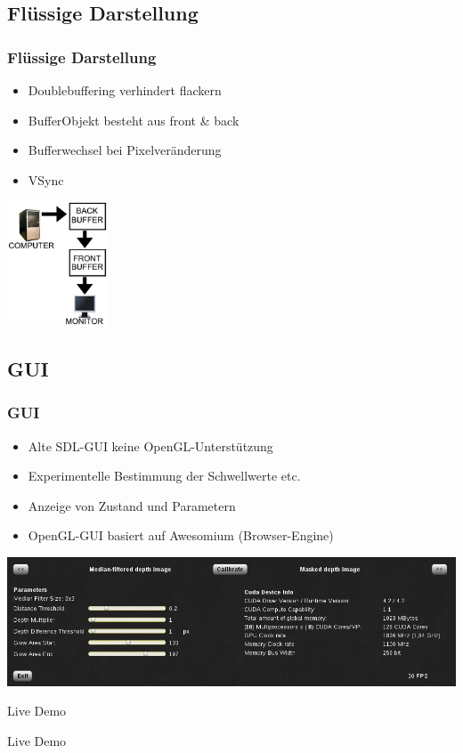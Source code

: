 \documentclass[compress]{beamer}
\begin{document}
\subsection{Flüssige Darstellung}
\begin{frame}
\frametitle{Flüssige Darstellung}
\begin{itemize}
\item Doublebuffering verhindert flackern
\item BufferObjekt besteht aus front \& back
\item Bufferwechsel bei Pixelveränderung
\item VSync
\end{itemize}
\hspace*{4cm}\includegraphics[width=3cm]{double.png}
\end{frame}

\subsection{GUI}
\begin{frame}
\frametitle{GUI}
\begin{itemize}
\item Alte SDL-GUI keine OpenGL-Unterstützung
\item Experimentelle Bestimmung der Schwellwerte etc.
\item Anzeige von Zustand und Parametern
\item OpenGL-GUI basiert auf Awesomium (Browser-Engine)
\end{itemize}
\includegraphics[width=\textwidth]{gui.png}
\end{frame}

\begin{frame}{Live Demo}
\Huge
\centerline{Live Demo}
\end{frame}
\end{document}

